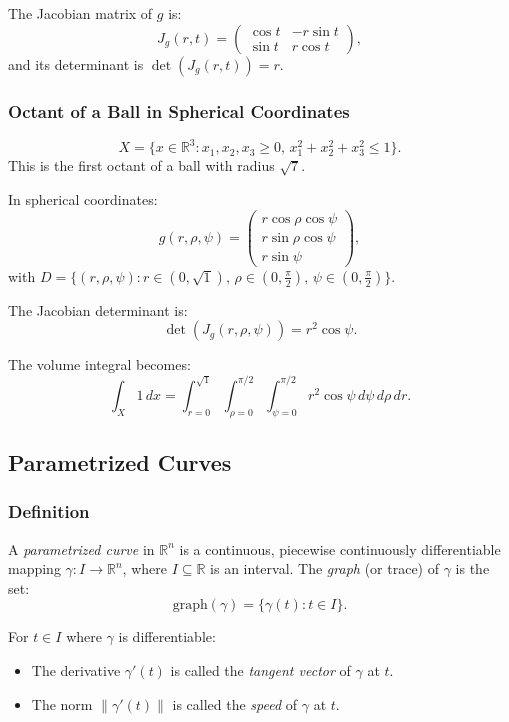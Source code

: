 \documentclass{article}
\begin{document}
    The Jacobian matrix of \( g \) is:  
    \[ J_g(r, t) = \begin{pmatrix} \cos t & -r \sin t \\ \sin t & r \cos t \end{pmatrix}, \]  
    and its determinant is \( \det(J_g(r, t)) = r \).
    
    \subsubsection{Octant of a Ball in Spherical Coordinates}
    \[ X = \{ x \in \mathbb{R}^3 : x_1, x_2, x_3 \geq 0, \, x_1^2 + x_2^2 + x_3^2 \leq 1 \}. \]  
    This is the first octant of a ball with radius \( \sqrt{7} \).  
    
    In spherical coordinates:  
    \[ g(r, \rho, \psi) = \begin{pmatrix} r \cos \rho \cos \psi \\ r \sin \rho \cos \psi \\ r \sin \psi \end{pmatrix}, \]  
    with \( D = \{(r, \rho, \psi) : r \in (0, \sqrt{1}), \, \rho \in (0, \frac{\pi}{2}), \, \psi \in (0, \frac{\pi}{2})\} \).  
    
    The Jacobian determinant is:  
    \[ \det(J_g(r, \rho, \psi)) = r^2 \cos \psi. \]  
    
    The volume integral becomes:  
    \[ \int_X 1 \, dx = \int_{r=0}^{\sqrt{1}} \int_{\rho=0}^{\pi/2} \int_{\psi=0}^{\pi/2} r^2 \cos \psi \, d\psi \, d\rho \, dr. \]
    
    \subsection{Parametrized Curves}
    
    \subsubsection*{Definition}
    A \textit{parametrized curve} in \( \mathbb{R}^n \) is a continuous, piecewise continuously differentiable mapping \( \gamma : I \to \mathbb{R}^n \), where \( I \subseteq \mathbb{R} \) is an interval. The \textit{graph} (or trace) of \( \gamma \) is the set:  
    \[ \text{graph}(\gamma) = \{\gamma(t) : t \in I\}. \]  
    
    For \( t \in I \) where \( \gamma \) is differentiable:  
    \begin{itemize}
        \item The derivative \( \gamma'(t) \) is called the \textit{tangent vector} of \( \gamma \) at \( t \).
        \item The norm \( \|\gamma'(t)\| \) is called the \textit{speed} of \( \gamma \) at \( t \).
    \end{itemize}
    
\end{document}
